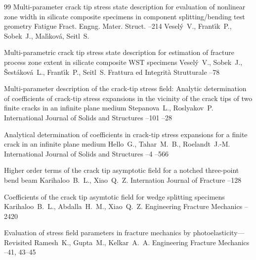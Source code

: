 \begin{thebibliography}{99}
\paper  Multi-parameter crack tip stress state description for evaluation of nonlinear zone width in silicate composite specimens in component splitting/bending test geometry
\jour Fatigue Fract. Engng. Mater. Struct.
--214
\by Vesel\'y~V.,  Frant\'{\i}k~P., Sobek~J., Mal\'{\i}kov\'a,  Seitl~S.

\paper Multi-parametric crack tip stress state description for estimation of fracture process zone extent in silicate composite WST specimens
\by Vesel\'y~V., Sobek~J., \v{S}est\'akov\'a~L., Frant\'{\i}k~P., Seitl~S.
\jour Frattura ed Integrit\`a Strutturale
--78


\paper  Multi-parameter description of the crack-tip stress field: Analytic determination of coefficients of crack-tip stress expansions in the vicinity of the crack tips of two finite cracks in an infinite plane medium
\by Stepanova~L.,  Roslyakov~P.
\jour International Journal of Solids and Structures
--101
--28

\paper  Analytical determination of coefficients in crack-tip stress expansions for a finite crack in an infinite plane medium
\by Hello~G.,  Tahar~M.~B., Roelandt~J.-M.
\jour International Journal of Solids and Structures
--4
--566

\paper Higher order terms of the crack tip asymptotic field for a notched three-point bend beam
\by Karihaloo~B.~L.,  Xiao~Q.~Z.
\jour Internation Journal of Fracture
--128

\paper  Coefficients of the crack tip asymtotic field for wedge splitting specimens
\by Karihaloo~B.~L., Abdalla~H.~M., Xiao~Q.~Z.
\jour Engineering Fracture Mechanics
--2420

\paper  Evaluation of stress field parameters in fracture mechanics by photoelasticity—Revisited
\by Ramesh~K., Gupta~M., Kelkar~A.~A.
\jour Engineering Fracture Mechanics
--41, 43--45




\end{thebibliography}
